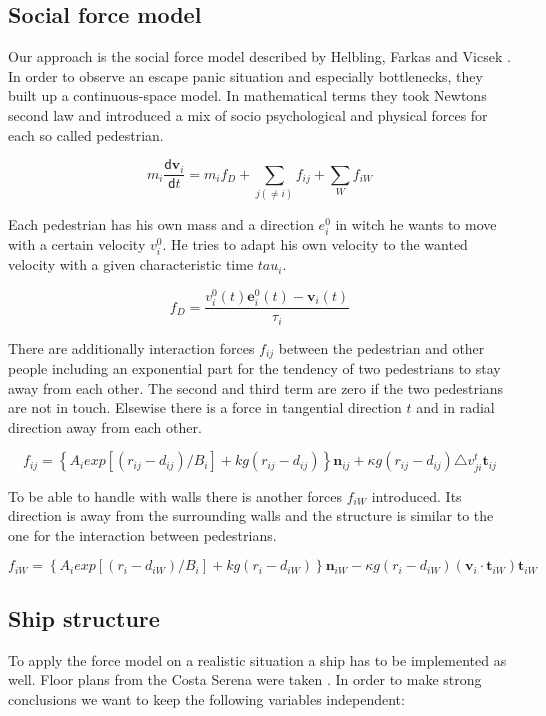 \documentclass[11pt]{article}
\begin{document}
\subsection{Social force model }
Our approach is the social force model described by Helbling, Farkas and Vicsek \cite{EscapePanic}. In order to observe an escape panic situation and especially bottlenecks, they built up a continuous-space model. In mathematical terms they took Newtons second law and introduced a mix of socio psychological and physical forces for each so called pedestrian. 

\begin{equation}
m_{i}\frac{\mathsf{d}\mathbf{v}_{i}}{\mathsf{d}t}=m_{i}f_{D}+\sum \limits_{j(\neq{i})}{f_{ij}}+\sum \limits_{W}{f_{iW}}
\end{equation}

Each pedestrian has his own mass and a direction $e_i^0$ in witch he wants to move with a certain velocity $v_i^0$. He tries to adapt his own velocity to the wanted velocity with a given characteristic time $tau_i$.

\begin{equation}
f_{D}=\frac{v_{i}^{0}(t)\mathbf{e}_{i}^{0}(t)-\mathbf{v}_{i}(t)}{\tau_{i}}
\end{equation}

There are additionally interaction forces $f_{ij}$ between the pedestrian and other people including an exponential part for the tendency of two pedestrians to stay away from each other. The second and third term are zero if the two pedestrians are not in touch. Elsewise there is a force in tangential direction $t$ and in radial direction away from each other. 

\begin{equation}
f_{ij} = \left\{A_{i}exp[(r_{ij}-d_{ij})/B_{i}]+kg(r_{ij}-d_{ij})\right\}\mathbf{n}_{ij}+\kappa g(r_{ij}-d_{ij})\triangle v_{ji}^t\mathbf{t}_{ij}
\end{equation}

To be able to handle with walls there is another forces $f_{iW}$ introduced. Its direction is away from the surrounding walls and the structure is similar to the one for the interaction between pedestrians.

\begin{equation}
f_{iW}=\left\{A_{i}exp[(r_{i}-d_{iW})/B_{i}]+kg(r_{i}-d_{iW})\right\}\mathbf{n}_{iW}-\kappa g(r_{i}-d_{iW})(\mathbf{v}_{i}\cdot\mathbf{t}_{iW})\mathbf{t}_{iW}
\end{equation}
\newpage
\subsection{Ship structure}
To apply the force model on a realistic situation a ship has to be implemented as well. Floor plans from the Costa Serena were taken \cite{shipdecks}. In order to make strong conclusions we want to keep the following variables independent:
\end{document}
